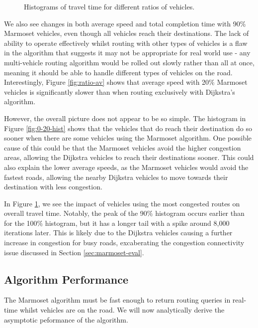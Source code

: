 \documentclass[ %
                    author={Alexander Hill},
                supervisor={Dr. Benjamin Sach},
                    degree={MEng},
                     title={MARMOSET},
                  subtitle={Multi-Agent Route Management using Online Simulation for Efficient Transportation},
                      type={research},
                      year={2016} ]{dissertation}
\begin{document}
\begin{figure}[h]
\begin{subfigure}[b]{0.45\textwidth}
        \caption{}\label{fig:90-100-hist}
    \end{subfigure}
    \caption{Histograms of travel time for different ratios of vehicles.}\label{fig:ratio-hists}
\end{figure}

We also see changes in both average speed and total completion time with 90\%
Marmoset vehicles, even though all vehicles reach their destinations. The lack
of ability to operate effectively whilst routing with other types of vehicles is
a flaw in the algorithm that suggests it may not be appropriate for real world
use - any multi-vehicle routing algorithm would be rolled out slowly rather than
all at once, meaning it should be able to handle different types of vehicles on
the road. Interestingly, Figure \ref{fig:ratio-av} shows that average speed with
20\% Marmoset vehicles is significantly slower than when routing exclusively
with Dijkstra's algorithm.

However, the overall picture does not appear to be so simple. The histogram in
Figure \ref{fig:0-20-hist} shows that the vehicles that do reach their
destination do so sooner when there are some vehicles using the Marmoset
algorithm. One possible cause of this could be that the Marmoset vehicles avoid
the higher congestion areas, allowing the Dijkstra vehicles to reach their
destinations sooner. This could also explain the lower average speeds, as the
Marmoset vehicles would avoid the fastest roads, allowing the nearby Dijkstra
vehicles to move towards their destination with less congestion.

In Figure \ref{fig:90-100-hist}, we see the impact of vehicles using the most
congested routes on overall travel time. Notably, the peak of the 90\% histogram
occurs earlier than for the 100\% histogram, but it has a longer tail with a
spike around 8,000 iterations later. This is likely due to the Dijkstra vehicles
causing a further increase in congestion for busy roads, excaberating the
congestion connectivity issue discussed in Section \ref{sec:marmoset-eval}.

\subsection{Algorithm Performance}

The Marmoset algorithm must be fast enough to return routing queries in real-time
whilst vehicles are on the road. We will now analytically derive the asymptotic
peformance of the algorithm.
\end{document}
